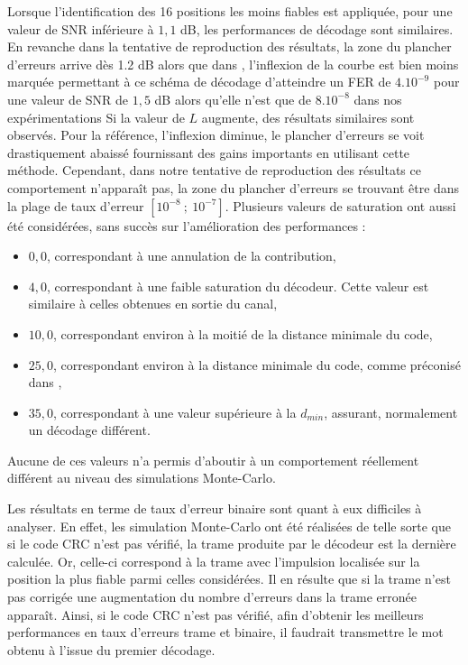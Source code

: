 Lorsque l'identification des 16 positions les moins fiables est appliquée, pour une valeur de SNR inférieure à $1,1$ dB, les 
performances de décodage sont similaires. En revanche dans la tentative de reproduction des résultats, la zone du plancher
d'erreurs arrive dès 1.2 dB alors que dans \cite{cim}, l'inflexion de la courbe est bien moins marquée permettant à ce 
schéma de décodage d'atteindre un FER de $4.10^{-9}$ pour une valeur de SNR de $1,5$ dB alors qu'elle n'est que de $8.10^{-8}$
dans nos expérimentations Si la valeur de $L$ augmente, des résultats similaires sont observés. Pour la référence, 
l'inflexion diminue, le plancher d'erreurs se voit drastiquement abaissé fournissant des gains importants en utilisant
cette méthode. Cependant, dans notre tentative de reproduction des résultats ce comportement n’apparaît pas, la zone du 
plancher d'erreurs se trouvant être dans la plage de taux d'erreur $[10^{-8}~;~10^{-7}]$. Plusieurs valeurs de saturation 
ont aussi été considérées, sans succès sur l'amélioration des performances :
\begin{itemize}
	\item $0,0$, correspondant à une annulation de la contribution, 
	\item $4,0$, correspondant à une faible saturation du décodeur. Cette valeur est similaire à celles obtenues en sortie du canal,
	\item $10,0$, correspondant environ à la moitié de la distance minimale du code,
	\item $25,0$, correspondant environ à la distance minimale du code, comme préconisé dans \cite{cim, fsm},
	\item $35,0$, correspondant à une valeur supérieure à la $d_{min}$, assurant, normalement un décodage différent.
\end{itemize}
Aucune de ces valeurs n'a permis d'aboutir à un comportement réellement différent au niveau des simulations Monte-Carlo.

Les résultats en terme de taux d'erreur binaire sont quant à eux difficiles à analyser. En effet, les simulation Monte-Carlo 
ont été réalisées de telle sorte que si le code CRC n'est pas vérifié, la trame produite par le décodeur est la dernière calculée.
Or, celle-ci correspond à la trame avec l'impulsion localisée sur la position la plus fiable parmi celles considérées. 
Il en résulte que si la trame n'est pas corrigée une augmentation du nombre d'erreurs dans la trame erronée apparaît. Ainsi, 
si le code CRC n'est pas vérifié, afin d'obtenir les meilleurs performances en taux d'erreurs trame et binaire, il faudrait 
transmettre le mot obtenu à l'issue du premier décodage.

